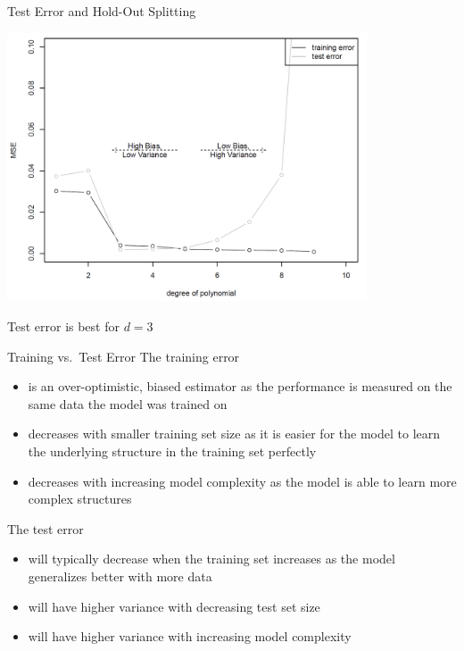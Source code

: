 \begin{frame}{Test Error and Hold-Out Splitting}
\scriptsize

\begin{center}
\includegraphics[width=0.8\textwidth]{plots/test_error03.png}
\end{center}

\normalsize  Test error is best for \(d=3\)
\end{frame}


\begin{frame}{Training vs.~Test Error}
The training error

\begin{itemize}
\item is an over-optimistic, biased estimator as the performance is
  measured on the same data the  model  was trained on
\item decreases with smaller training set size as it is easier for the model
  to learn the underlying structure in the training set perfectly
\item decreases with increasing model complexity as the model is able to
  learn more complex structures
\end{itemize}

The test error

\begin{itemize}
\item will typically decrease when the training set increases as the model
  generalizes better with more data
\item will have higher variance with decreasing test set size
\item will have higher variance with increasing model complexity
\end{itemize}

\end{frame}



